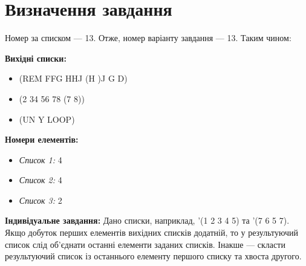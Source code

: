 \documentclass[a4paper, 12pt]{extarticle}
\begin{document}
\section{Визначення завдання}
Номер за списком --- 13. Отже, номер варіанту завдання --- 13.
Таким чином:

\textbf{Вихідні списки:}
\begin{itemize}
  \item (REM FFG HHJ (H )J G D)
  \item (2 34 56 78 (7 8))
  \item (UN Y LOOP)
\end{itemize}

\textbf{Номери елементів:}
\begin{itemize}
  \item \textit{Список 1:} 4
  \item \textit{Список 2:} 4
  \item \textit{Список 3:} 2
\end{itemize}

\textbf{Індивідуальне завдання:}
Дано списки, наприклад, '(1 2 3 4 5) та '(7 6 5 7). Якщо добуток перших елементів вихідних списків додатній, то у результуючий список слід об'єднати останні елементи заданих списків. Інакше --- скласти результуючий список із останнього елементу першого списку та хвоста другого.
\end{document}
